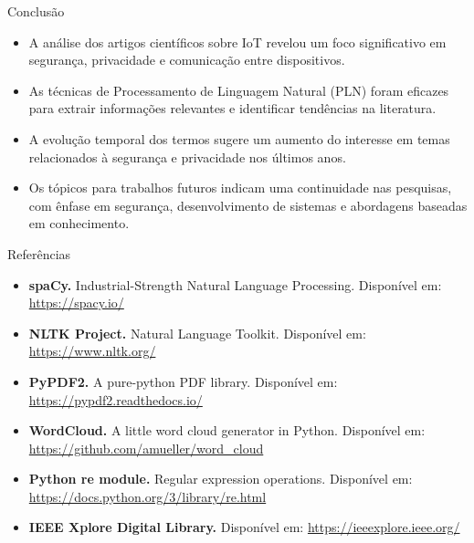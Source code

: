 \documentclass{beamer}
\begin{document}
\begin{frame}{Conclusão}
    \begin{itemize}
        \item A análise dos artigos científicos sobre IoT revelou um foco significativo em segurança, privacidade e comunicação entre dispositivos.
        \item As técnicas de Processamento de Linguagem Natural (PLN) foram eficazes para extrair informações relevantes e identificar tendências na literatura.
        \item A evolução temporal dos termos sugere um aumento do interesse em temas relacionados à segurança e privacidade nos últimos anos.
        \item Os tópicos para trabalhos futuros indicam uma continuidade nas pesquisas, com ênfase em segurança, desenvolvimento de sistemas e abordagens baseadas em conhecimento.
    \end{itemize}
\end{frame}

\begin{frame}{Referências}
\footnotesize
\begin{itemize}
    \item \textbf{spaCy.} Industrial-Strength Natural Language Processing. Disponível em: \url{https://spacy.io/}
    \item \textbf{NLTK Project.} Natural Language Toolkit. Disponível em: \url{https://www.nltk.org/}
    \item \textbf{PyPDF2.} A pure-python PDF library. Disponível em: \url{https://pypdf2.readthedocs.io/}
    \item \textbf{WordCloud.} A little word cloud generator in Python. Disponível em: \url{https://github.com/amueller/word_cloud}
    \item \textbf{Python re module.} Regular expression operations. Disponível em: \url{https://docs.python.org/3/library/re.html}
    \item \textbf{IEEE Xplore Digital Library.} Disponível em: \url{https://ieeexplore.ieee.org/}
\end{itemize}
\end{frame}
\end{document}
